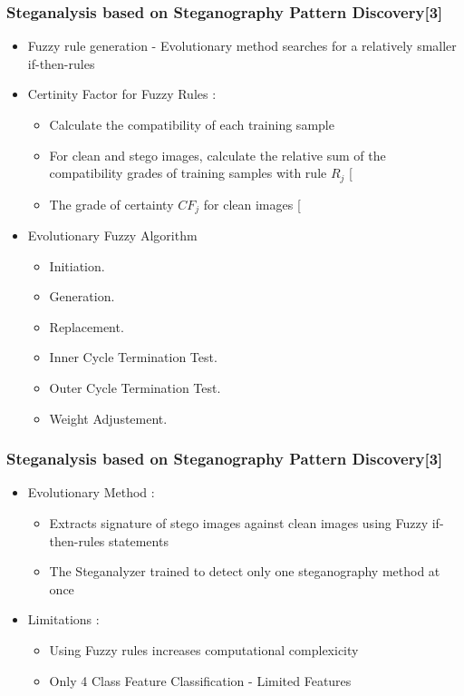 \documentclass{beamer} %
\theoremstyle{definition} %
\begin{document}
\begin{frame}
\frametitle{Steganalysis based on Steganography Pattern Discovery[3]}
\begin{itemize}
	\item Fuzzy rule generation - Evolutionary method searches for a relatively smaller if-then-rules
	\item Certinity Factor for Fuzzy Rules : 
	\begin{itemize}
	    \item Calculate the compatibility of each training sample
	    \item For clean and stego images, calculate the relative sum of the compatibility grades of training samples with rule $R_j$ [ 
	    \item The grade of certainty $CF_j$ for clean images [ 
	\end{itemize}
    \item Evolutionary Fuzzy Algorithm 
    \begin{itemize}
    	\item Initiation.
    	\item Generation. 
    	\item Replacement. 
    	\item Inner Cycle Termination Test. 
    	\item Outer Cycle Termination Test. 
    	\item Weight Adjustement. 
    \end{itemize}
\end{itemize}
\end{frame}

\begin{frame}
\frametitle{Steganalysis based on Steganography Pattern Discovery[3] }
\begin{itemize}
		\item Evolutionary Method : 
		\begin{itemize}
			\item Extracts signature of stego images against clean images using Fuzzy if-then-rules statements 
			\item The Steganalyzer trained to detect only one steganography method at once 
		\end{itemize}
	    \item Limitations : 
	    \begin{itemize}
	    	\item Using Fuzzy rules increases computational complexicity  
	    	\item Only 4 Class Feature Classification - Limited Features  
	    \end{itemize}
\end{itemize}
\end{frame}
\end{document}
